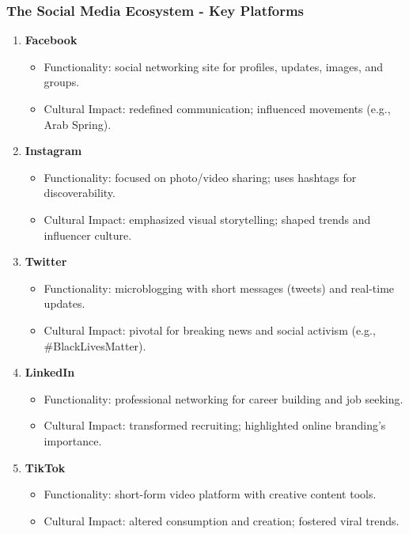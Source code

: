 \documentclass{beamer}
\begin{document}
\begin{frame}[fragile]
    \frametitle{The Social Media Ecosystem - Key Platforms}
    \begin{enumerate}
        \item \textbf{Facebook}
        \begin{itemize}
            \item Functionality: social networking site for profiles, updates, images, and groups.
            \item Cultural Impact: redefined communication; influenced movements (e.g., Arab Spring).
        \end{itemize}

        \item \textbf{Instagram}
        \begin{itemize}
            \item Functionality: focused on photo/video sharing; uses hashtags for discoverability.
            \item Cultural Impact: emphasized visual storytelling; shaped trends and influencer culture.
        \end{itemize}

        \item \textbf{Twitter}
        \begin{itemize}
            \item Functionality: microblogging with short messages (tweets) and real-time updates.
            \item Cultural Impact: pivotal for breaking news and social activism (e.g., #BlackLivesMatter).
        \end{itemize}

        \item \textbf{LinkedIn}
        \begin{itemize}
            \item Functionality: professional networking for career building and job seeking.
            \item Cultural Impact: transformed recruiting; highlighted online branding's importance.
        \end{itemize}

        \item \textbf{TikTok}
        \begin{itemize}
            \item Functionality: short-form video platform with creative content tools.
            \item Cultural Impact: altered consumption and creation; fostered viral trends.
        \end{itemize}
    \end{enumerate}
\end{frame}
\end{document}
